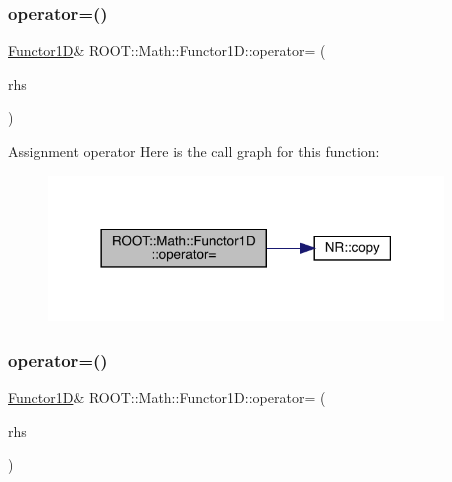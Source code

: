 \subsubsection{\texorpdfstring{operator=()}{operator=()}\hspace{0.1cm}{\footnotesize\ttfamily [1/3]}}
{\footnotesize\ttfamily \mbox{\hyperlink{classROOT_1_1Math_1_1Functor1D}{Functor1D}}\& R\+O\+O\+T\+::\+Math\+::\+Functor1\+D\+::operator= (\begin{DoxyParamCaption}\item[{const \mbox{\hyperlink{classROOT_1_1Math_1_1Functor1D}{Functor1D}} \&}]{rhs }\end{DoxyParamCaption})\hspace{0.3cm}{\ttfamily [inline]}}

Assignment operator Here is the call graph for this function\+:
\nopagebreak
\begin{figure}[H]
\begin{center}
\leavevmode
\includegraphics[width=297pt]{dc/d6d/classROOT_1_1Math_1_1Functor1D_a723dff64cd3d4e53174624fa56f30a18_cgraph}
\end{center}
\end{figure}
\mbox{\label{classROOT_1_1Math_1_1Functor1D_a723dff64cd3d4e53174624fa56f30a18}} 
\subsubsection{\texorpdfstring{operator=()}{operator=()}\hspace{0.1cm}{\footnotesize\ttfamily [2/3]}}
{\footnotesize\ttfamily \mbox{\hyperlink{classROOT_1_1Math_1_1Functor1D}{Functor1D}}\& R\+O\+O\+T\+::\+Math\+::\+Functor1\+D\+::operator= (\begin{DoxyParamCaption}\item[{const \mbox{\hyperlink{classROOT_1_1Math_1_1Functor1D}{Functor1D}} \&}]{rhs }\end{DoxyParamCaption})\hspace{0.3cm}{\ttfamily [inline]}}


